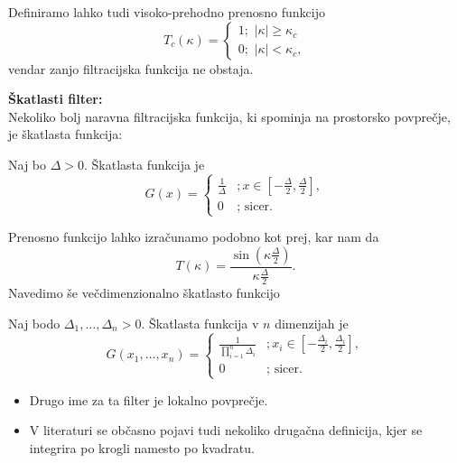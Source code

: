 \documentclass[mat2, tisk]{fmfdelo}
\begin{document}
\begin{opomba}
Definiramo lahko tudi visoko-prehodno prenosno funkcijo
$$
T_c(\kappa)=\left\{\begin{array}{l}
  1 ;\,\, |\kappa| \geq \kappa_c \\
  0 ;\,\, |\kappa| < \kappa_c,
\end{array}\right.
$$
vendar zanjo filtracijska funkcija ne obstaja.
\end{opomba}


\noindent
\textbf{Škatlasti filter:}\\
Nekoliko bolj naravna filtracijska funkcija, ki spominja na prostorsko povprečje, je 
škatlasta funkcija:
\begin{definicija}
Naj bo $\Delta > 0$. Škatlasta funkcija je 
\begin{equation*}
G(x)= \begin{cases}\frac{1}{\Delta} & ; x \in\left[-\frac{\Delta}{2}, \frac{\Delta}{2}\right], \\ 0 & ; \text { sicer. }\end{cases}
\end{equation*}
\end{definicija}

Prenosno funkcijo lahko izračunamo podobno kot prej, kar nam da 
$$
T(\kappa) = \frac{\sin(\kappa \frac{\Delta}{2})}{\kappa \frac{\Delta}{2}}.
$$
Navedimo še večdimenzionalno škatlasto funkcijo
\begin{definicija}
Naj bodo $\Delta_1, \dots, \Delta_n > 0$.
Škatlasta funkcija v $n$ dimenzijah je
\begin{equation*}
  G(x_1, \dots, x_n)= \begin{cases}\frac{1}{\prod_{i=1}^{n}\Delta_i} & ; x_i \in\left[-\frac{\Delta_i}{2}, \frac{\Delta_i}{2}\right], \\ 0 & ; \text { sicer. }\end{cases}
\end{equation*}  
\end{definicija}

\begin{opomba}
  \hfill
  \begin{itemize}
    \item Drugo ime za ta filter je lokalno povprečje.
    \item V literaturi se občasno pojavi tudi nekoliko drugačna definicija, kjer 
    se integrira po krogli namesto po kvadratu.
  \end{itemize}
  \end{opomba}
  
\end{document}
